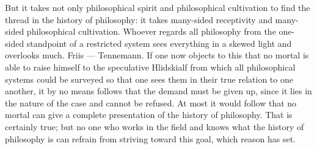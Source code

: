 \documentclass[12pt]{article}
\newcommand{\opage}[1]{\marginnote{\footnotesize\textit{[#1]}}}
\begin{document}
But it takes not only philosophical spirit and philosophical cultivation to find the thread in the history of philosophy: it takes many-sided receptivity and many-sided philosophical cultivation. Whoever regards all philosophy\opage{5v} from the one-sided standpoint of a restricted system sees everything in a skewed light and overlooks much. Friis --- Tennemann. %
If one now objects to this that no mortal is able to raise himself to the speculative Hlidskialf from which all philosophical systems could be surveyed so that one sees them in their true relation to one another, it by no means follows that the demand must be given up, since it lies in the nature of the case and cannot be refused. At most it would follow that no mortal can give a complete presentation of the history of philosophy. That is certainly true; but no one who works in the field and knows what the history of philosophy is can refrain from striving toward this goal, which reason has set.
\end{document}
